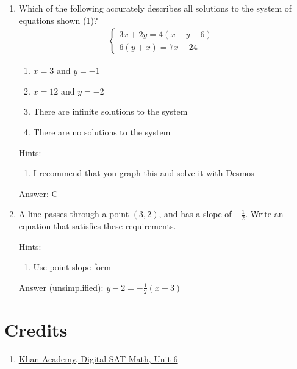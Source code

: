 \documentclass{article}
\begin{document}
\begin{enumerate}
	\item{Which of the following accurately describes all solutions to the system of equations shown (1)?
	      \[
		      \begin{array}{l}
			      \begin{cases}
				      3x+2y=4(x-y-6) & \\
				      6(y+x)=7x-24
			      \end{cases}
		      \end{array}
	      \]

	      \begin{enumerate}
		      \item{$x=3$ and $y=-1$}
		      \item{$x=12$ and $y=-2$}
		      \item{There are infinite solutions to the system}
		      \item{There are no solutions to the system}
	      \end{enumerate}

	      Hints:
	      \begin{enumerate}
		      \item{I recommend that you graph this and solve it with Desmos}
	      \end{enumerate}

	      Answer: C
	      }
	\item{A line passes through a point $(3,2)$, and has a slope of $-\frac{1}{2}$. Write an equation that satisfies these requirements.

	      Hints:
	      \begin{enumerate}
		      \item{Use point slope form}
	      \end{enumerate}

	      Answer (unsimplified): \(y-2=-\frac{1}{2}(x-3)\)
	      }

\end{enumerate}

\section{Credits}
\begin{enumerate}

	\item{
	      \href{https://www.khanacademy.org/test-prep/v2-sat-math/x0fcc98a58ba3bea7:algebra-medium}{Khan Academy, Digital SAT Math, Unit 6}}

\end{enumerate}
\end{document}
